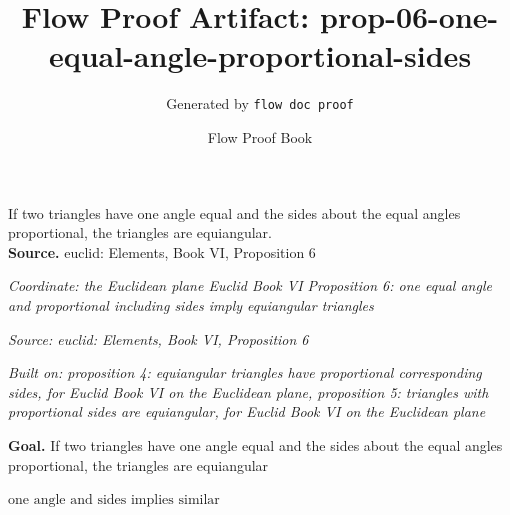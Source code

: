 \documentclass[11pt]{article}
\title{Flow Proof Artifact: prop-06-one-equal-angle-proportional-sides}
\author{Generated by \texttt{flow doc proof}}
\date{Flow Proof Book}
\theoremstyle{definition}
\begin{document}
\maketitle
If two triangles have one angle equal and the sides about the equal angles proportional, the triangles are equiangular.\\[0.5em]
\textbf{Source.} euclid: Elements, Book VI, Proposition 6\\[0.5em]
\bigskip
{}\par
\smallskip\noindent\textit{Coordinate: the Euclidean plane \cdot Euclid Book VI \cdot Proposition 6: one equal angle and proportional including sides imply equiangular triangles}\par
\smallskip\noindent\textit{Source: euclid: Elements, Book VI, Proposition 6}\par
\smallskip\noindent\textit{Built on: proposition 4: equiangular triangles have proportional corresponding sides, for Euclid Book VI on the Euclidean plane, proposition 5: triangles with proportional sides are equiangular, for Euclid Book VI on the Euclidean plane}\par
\medskip
\noindent\textbf{Goal.} If two triangles have one angle equal and the sides about the equal angles proportional, the triangles are equiangular\par
\noindent$\displaystyle \text{one angle and sides implies similar}$\par
\medskip
\noindent
\end{document}
